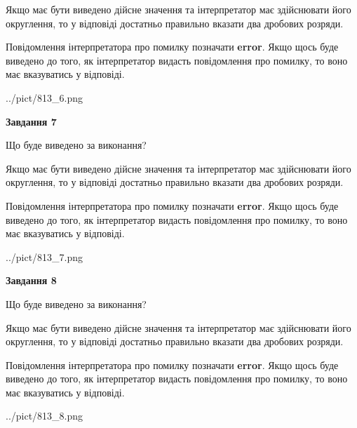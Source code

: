 \documentclass[12pt, ukrainian]{article}
\begin{document}
{\begin {Large}
Якщо має бути виведено дійсне значення та інтерпретатор має здійснювати його округлення, 
то у відповіді достатньо правильно вказати два дробових розряди.

Повідомлення інтерпретатора про помилку позначати \textbf{error}.
Якщо щось буде виведено до того, як інтерпретатор видасть повідомлення про помилку, 
то воно має вказуватись у відповіді. \par

\begin{center}
	{../pict/813_6.png}
\end{center}
\newpage

{\begin {center}\textbf{Завдання 7}\end {center}}\par
Що буде виведено за виконання? \par

Якщо має бути виведено дійсне значення та інтерпретатор має здійснювати його округлення, 
то у відповіді достатньо правильно вказати два дробових розряди.

Повідомлення інтерпретатора про помилку позначати \textbf{error}.
Якщо щось буде виведено до того, як інтерпретатор видасть повідомлення про помилку, 
то воно має вказуватись у відповіді. \par

\begin{center}
	{../pict/813_7.png}
\end{center}
\newpage

{\begin {center}\textbf{Завдання 8}\end {center}}\par
Що буде виведено за виконання? \par

Якщо має бути виведено дійсне значення та інтерпретатор має здійснювати його округлення, 
то у відповіді достатньо правильно вказати два дробових розряди.

Повідомлення інтерпретатора про помилку позначати \textbf{error}.
Якщо щось буде виведено до того, як інтерпретатор видасть повідомлення про помилку, 
то воно має вказуватись у відповіді. \par

\begin{center}
	{../pict/813_8.png}
\end{center}
\newpage


\end{Large}}
\end{document}
